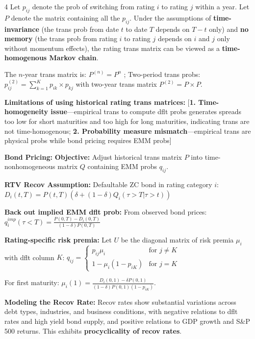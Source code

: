 \documentclass[landscape]{article}
\begin{document}
\begin{multicols}{4}
Let $p_{ij}$ denote the prob of switching from rating $i$ to rating $j$ within a year. Let $P$ denote the matrix containing all the $p_{ij}$. Under the assumptions of \textbf{time-invariance} (the trans prob from date $t$ to date $T$ depends on $T-t$ only) and \textbf{no memory} (the trans prob from rating $i$ to rating $j$ depends on $i$ and $j$ only without momentum effects), the rating trans matrix can be viewed as a \textbf{\textcolor{conceptcolor}{time-homogenous Markov chain}}.

The $n$-year trans matrix is: $P^{(n)} = P^n$
; Two-period trans probs: $p_{ij}^{(2)} = \sum_{k=1}^K p_{ik} \times p_{kj}$ with two-year trans matrix $P^{(2)} = P \times P$.

\textbf{Limitations of using historical rating trans matrices:} [\textcolor{rulecolor}{\textbf{1. Time-homogeneity issue}}—empirical trans to compute dflt probs generates spreads too low for short maturities and too high for long maturities, indicating trans are not time-homogenous; \textcolor{rulecolor}{\textbf{2. Probability measure mismatch}}—empirical trans are physical probs while bond pricing requires EMM probs]

\textcolor{subsubsectioncolor}{\textbf{Bond Pricing:}} \textbf{Objective:} Adjust historical trans matrix $P$ into time-nonhomogeneous matrix $Q$ containing EMM probs $q_{ij}$.

\textbf{RTV Recov Assumption:} Defaultable ZC bond in rating category $i$: $D_i(t,T) = P(t,T)(\delta + (1-\delta)Q_i(\tau > T | \tau > t))$

\textbf{Back out implied EMM dflt prob:} From observed bond prices: $q_i^{imp}(\tau < T) = \frac{P(0,T) - D_i(0,T)}{(1-\delta)P(0,T)}$

\textbf{Rating-specific risk premia:} Let $U$ be the diagonal matrix of risk premia $\mu_i$ with dflt column $K$: $q_{ij} = \begin{cases} p_{ij}\mu_i & \text{for } j \neq K \\ 1 - \mu_i(1-p_{iK}) & \text{for } j = K \end{cases}$

For first maturity: $\mu_i(1) = \frac{D_i(0,1) - \delta P(0,1)}{(1-\delta)P(0,1)(1-p_{iK})}$.

\textcolor{subsectioncolor}{\textbf{Modeling the Recov Rate:}} Recov rates show substantial variations across debt types, industries, and business conditions, with negative relations to dflt rates and high yield bond supply, and positive relations to GDP growth and S\&P 500 returns. This exhibits \textbf{procyclicality of recov rates}.


\end{multicols}
\end{document}
